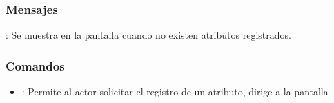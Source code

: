 \subsubsection{Mensajes}

\begin{Citemize}
	\item {}: Se muestra en la pantalla  cuando no existen atributos registrados.
\end{Citemize}

\label{IU12A}
\subsubsection{Comandos}
\begin{itemize}
	\item {}: Permite al actor solicitar el registro de un atributo, dirige a la pantalla 
\end{itemize}